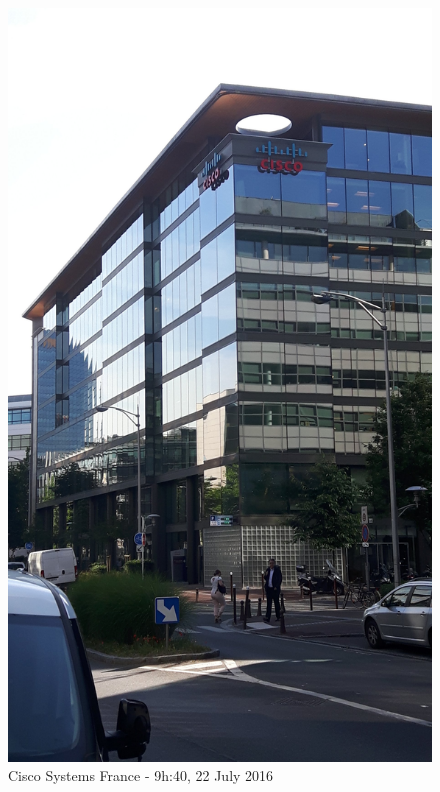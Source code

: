 \begin{figure}

\begin{center}

\includegraphics[scale = 0.1]{Pictures/cisco.jpg}

\caption{Cisco Systems France - 9h:40, 22 July 2016} \label{cisco} 

\end{center}

\end{figure}



